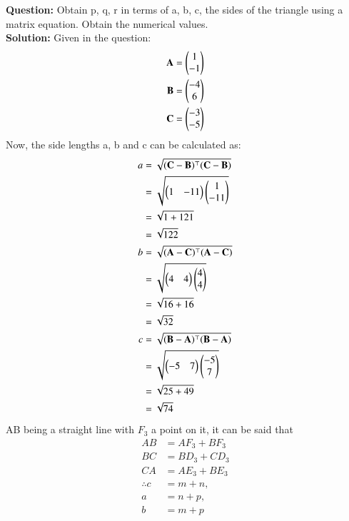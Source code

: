 \documentclass[journal,12pt,twocolumn]{IEEEtran}
\theoremstyle{remark}
\begin{document}
%
\textbf{Question:}
Obtain p, q, r in terms of a, b, c, the sides of the triangle using a matrix
equation. Obtain the numerical values.\\
\indent\textbf{Solution:}
Given in the question:
\begin{align}
    \mathbf{A} &= \begin{pmatrix} 1 \\ -1 \end{pmatrix}\\
    \mathbf{B} &= \begin{pmatrix} -4 \\ 6 \end{pmatrix}\\
    \mathbf{C} &= \begin{pmatrix} -3 \\ -5 \end{pmatrix} 
\end{align}
Now, the side lengths a, b and c can be calculated as:
\begin{align}
    a &= \sqrt{(\mathbf{C}-\mathbf{B})^{\top}(\mathbf{C}-\mathbf{B})}\\
    &= \sqrt{\begin{pmatrix}1&-11\end{pmatrix} \begin{pmatrix}1\\-11\end{pmatrix}}\\
    &= \sqrt{1+121}\\
    &=\sqrt{122}    \\
    b &= \sqrt{(\mathbf{A}-\mathbf{C})^{\top}(\mathbf{A}-\mathbf{C})}\\
    &= \sqrt{\begin{pmatrix}4&4\end{pmatrix} \begin{pmatrix}4\\4\end{pmatrix}}\\
    &= \sqrt{16+16}\\
    &=\sqrt{32}     \\
    c &= \sqrt{(\mathbf{B}-\mathbf{A})^{\top}(\mathbf{B}-\mathbf{A})}\\
    &= \sqrt{\begin{pmatrix}-5&7\end{pmatrix} \begin{pmatrix}-5\\7\end{pmatrix}}\\
    &= \sqrt{25+49}\\
    &=\sqrt{74}
\end{align}
AB being a straight line with $F_3$ a point on it, it can be said that
\begin{align}
    AB &= AF_3 + BF_3\\
    BC &= BD_3 + CD_3\\
    CA &= AE_3 + BE_3\\
% 
    \therefore 
    c &= m+n,\\
    a &= n+p, \\
    b &= m+p 
\end{align}
\end{document}
